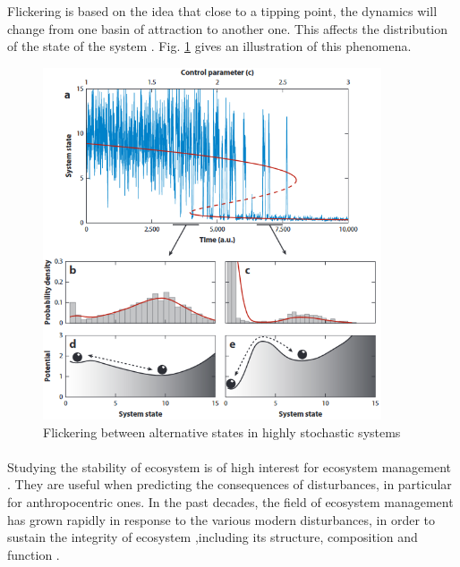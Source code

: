 \documentclass{article}
\begin{document}
Flickering is based on the idea that close to a tipping point, the dynamics will change from one basin of attraction to another one. This affects the distribution of the state of the system \citep{carr_modeling_2012, wang_flickering_2012, dakos_flickering_2013, scheffer_anticipating_2012}. Fig. \ref{fig:flick} gives an illustration of this phenomena.


\begin{figure}[h]
\begin{center}
\includegraphics[width=10cm]{flickering.png}
\end{center}
\caption{\label{fig:temp}Flickering between alternative states in highly stochastic systems \citep{scheffer_anticipating_2012}}
\label{fig:flick}
\end{figure}


\paragraph{}
Studying the stability of ecosystem is of high interest for ecosystem management \citep{mumby_ecological_2014}. They are useful when predicting the consequences of disturbances, in particular for anthropocentric ones. In the past decades, the field of ecosystem management has grown rapidly \citep{grumbine_reflections_1997} in response to the various modern disturbances, in order to sustain the integrity of ecosystem ,including its structure, composition and function \citep{jensen1994overview}. 
\end{document}
